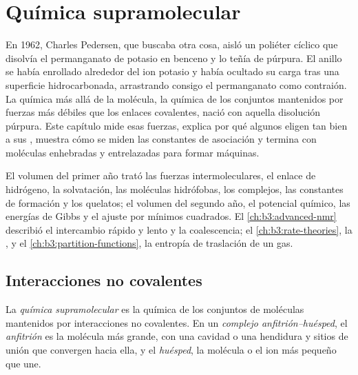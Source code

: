 \chapter{Química supramolecular}\label{ch:b3:supramolecular}

En 1962, Charles Pedersen, que buscaba otra cosa, aisló un poliéter cíclico
que disolvía el permanganato de potasio en benceno y lo teñía de
púrpura. El anillo se había enrollado alrededor del ion potasio y había ocultado su
carga tras una superficie hidrocarbonada, arrastrando consigo el permanganato como
contraión. La química más allá de la molécula, la química de los conjuntos mantenidos
por fuerzas más débiles que los enlaces covalentes, nació con aquella disolución púrpura.
Este capítulo mide esas fuerzas, explica por qué algunos  eligen tan bien a sus ,
muestra cómo se miden las constantes de asociación y termina con moléculas
enhebradas y entrelazadas para formar máquinas.

\begin{recall}
El volumen del primer año trató las fuerzas intermoleculares, el enlace de hidrógeno, la solvatación,
las moléculas hidrófobas, los complejos, las constantes de formación y los quelatos; el volumen del
segundo año, el potencial químico, las energías de Gibbs y el ajuste por mínimos cuadrados.
El \cref{ch:b3:advanced-nmr} describió el intercambio rápido y lento y la coalescencia;
el \cref{ch:b3:rate-theories}, la , y
el \cref{ch:b3:partition-functions}, la entropía de traslación de un gas.
\end{recall}

\section{Interacciones no covalentes}

\begin{definition}\label{def:b3:supramolecular:supramolecular}
La \emph{química supramolecular} es la química
de los conjuntos de moléculas mantenidos por interacciones no covalentes. En un
\emph{complejo anfitrión--huésped}, el \emph{anfitrión}
es la molécula más grande, con una cavidad o una hendidura y sitios de unión que convergen
hacia ella, y el \emph{huésped}, la molécula o el ion más pequeño que une.
\end{definition}


